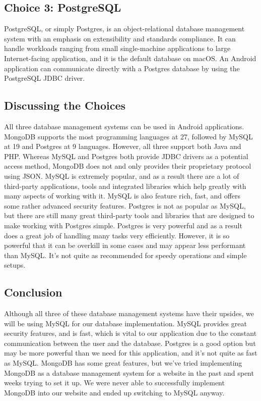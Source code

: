 \documentclass[draftclsnofoot, onecolumn, 10pt, compsoc]{IEEEtran}
\begin{document}
		\subsection{Choice 3: PostgreSQL}
			PostgreSQL, or simply Postgres, is an object-relational database management system with an emphasis on extensibility and standards compliance. It can handle workloads ranging from small single-machine applications to large Internet-facing application, and it is the default database on macOS. An Android application can communicate directly with a Postgres database by using the PostgreSQL JDBC driver.
			~\cite{wiki:PostgreSQL}
			~\cite{PostgreSQL_Android}
		
		\subsection{Discussing the Choices}
			All three database management systems can be used in Android applications. MongoDB supports the most programming languages at 27, followed by MySQL at 19 and Postgres at 9 languages. However, all three support both Java and PHP. Whereas MySQL and Postgres both provide JDBC drivers as a potential access method, MongoDB does not and only provides their proprietary protocol using JSON. MySQL is extremely popular, and as a result there are a lot of third-party applications, tools and integrated libraries which help greatly with many aspects of working with it. MySQL is also feature rich, fast, and offers some rather advanced security features. Postgres is not as popular as MySQL, but there are still many great third-party tools and libraries that are designed to make working with Postgres simple. Postgres is very powerful and as a result does a great job of handling many tasks very efficiently. However, it is so powerful that it can be overkill in some cases and may appear less performant than MySQL. It's not quite as recommended for speedy operations and simple setups.
			~\cite{DB_Comparison}
			~\cite{MySQL_vs_Postgres}
			
		\subsection{Conclusion}
			Although all three of these database management systems have their upsides, we will be using MySQL for our database implementation. MySQL provides great security features, and is fast, which is vital to our application due to the constant communication between the user and the database. Postgres is a good option but may be more powerful than we need for this application, and it's not quite as fast as MySQL. MongoDB has some great features, but we've tried implementing MongoDB as a database management system for a website in the past and spent weeks trying to set it up. We were never able to successfully implement MongoDB into our website and ended up switching to MySQL anyway.
	
\end{document}
